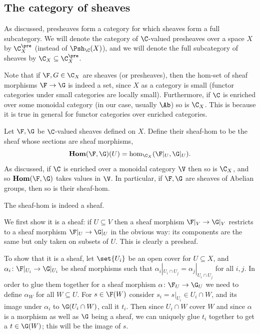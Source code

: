 \subsection{The category of sheaves}

As discussed, presheaves form a category for which sheaves form a full subcategory.
We will denote the category of $\C$-valued presheaves over a space $X$ by $\C_X^\pre$ (instead of $\Psh_\C(X)$), and we will denote the full
subcategory of sheaves by $\C_X\subseteq\C_X^\pre$.

Note that if $\F,G\in\C_X$ are sheaves (or presheaves), then the hom-set of sheaf morphisms $\F\to\G$ is indeed a set, since $X$ as a category
is small (functor categories under small categories are locally small).
Furthermore, if $\C$ is enriched over some monoidal category (in our case, usually $\Ab$) so is $\C_X$.
This is because it is true in general for functor categories over enriched categories.

\bdefn

    Let $\F,\G$ be $\C$-valued sheaves defined on $X$.
    Define their {\emphcolor sheaf-hom} to be the sheaf whose sections are sheaf morphisms,
    $$ \ihom(\F,\G)(U) = \hom_{\C_X}(\F|_U,\G|_U) . $$
    As discussed, if $\C$ is enriched over a monoidal category $\V$ then so is $\C_X$, and so $\ihom(\F,\G)$ takes values in $\V$.
    In particular, if $\F,\G$ are sheaves of Abelian groups, then so is their sheaf-hom.

\edefn

\bprop

    The sheaf-hom is indeed a sheaf.

\eprop

\bproof

    We first show it is a sheaf: if $U\subseteq V$ then a sheaf morphism $\F|_V\to\G|_V$ restricts to a sheaf morphism
    $\F|_U\to\G|_U$ in the obvious way: its components are the same but only taken on subsets of $U$.
    This is clearly a presheaf.

    To show that it is a sheaf, let $\set{U_i}$ be an open cover for $U\subseteq X$, and $\alpha_i\colon\F|_{U_i}\to\G|_{U_i}$ be sheaf morphisms
    such that $\alpha_i|_{U_i\cap U_j}=\alpha_j|_{U_i\cap U_j}$ for all $i,j$.
    In order to glue them together for a sheaf morphism $\alpha\colon\F_U\to\G_U$ we need to define $\alpha_W$ for all $W\subseteq U$.
    For $s\in\F(W)$ consider $s_i=s|_{U_i}\in U_i\cap W$, and its image under $\alpha_i$ to $\G(U_i\cap W)$, call it $t_i$.
    Then since $U_i\cap W$ cover $W$ and since $\alpha$ is a morphism as well as $\G$ being a sheaf, we can uniquely glue $t_i$ together to
    get a $t\in\G(W)$; this will be the image of $s$.

